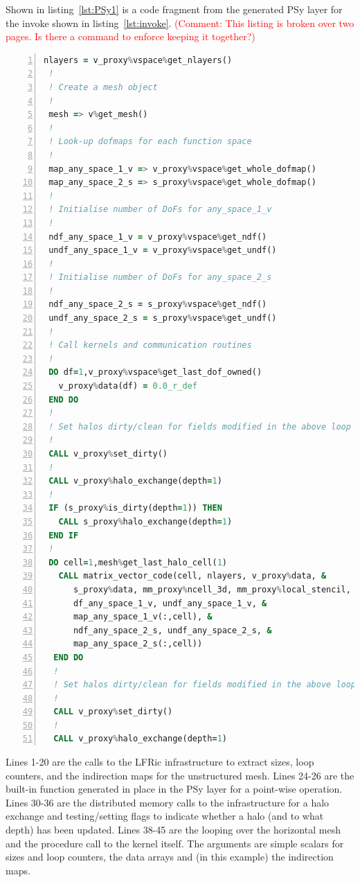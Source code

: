 \documentclass[times]{elsarticle}
\begin{document}
Shown in listing~\ref{lst:PSy1} is a code fragment from the generated PSy layer for
the invoke shown in listing~\ref{lst:invoke}.
\textcolor{red}{(Comment: This listing is broken over two pages. 
Is there a command to enforce keeping it together?)}
\begin{lstlisting}[language=Fortran, numbers=left,caption={Code 
fragment of the generated PSy layer},label={lst:PSy1}]
 nlayers = v_proxy%vspace%get_nlayers()
 !
 ! Create a mesh object
 !
 mesh => v%get_mesh()
 !
 ! Look-up dofmaps for each function space
 !
 map_any_space_1_v => v_proxy%vspace%get_whole_dofmap()
 map_any_space_2_s => s_proxy%vspace%get_whole_dofmap()
 !
 ! Initialise number of DoFs for any_space_1_v
 !
 ndf_any_space_1_v = v_proxy%vspace%get_ndf()
 undf_any_space_1_v = v_proxy%vspace%get_undf()
 !
 ! Initialise number of DoFs for any_space_2_s
 !
 ndf_any_space_2_s = s_proxy%vspace%get_ndf()
 undf_any_space_2_s = s_proxy%vspace%get_undf()
 !
 ! Call kernels and communication routines
 !
 DO df=1,v_proxy%vspace%get_last_dof_owned()
   v_proxy%data(df) = 0.0_r_def
 END DO 
 !
 ! Set halos dirty/clean for fields modified in the above loop
 !
 CALL v_proxy%set_dirty()
 !
 CALL v_proxy%halo_exchange(depth=1)
 !
 IF (s_proxy%is_dirty(depth=1)) THEN
   CALL s_proxy%halo_exchange(depth=1)
 END IF 
 !
 DO cell=1,mesh%get_last_halo_cell(1)
   CALL matrix_vector_code(cell, nlayers, v_proxy%data, &
      s_proxy%data, mm_proxy%ncell_3d, mm_proxy%local_stencil, &
      df_any_space_1_v, undf_any_space_1_v, &
      map_any_space_1_v(:,cell), &
      ndf_any_space_2_s, undf_any_space_2_s, &
      map_any_space_2_s(:,cell))
  END DO 
  !
  ! Set halos dirty/clean for fields modified in the above loop
  !
  CALL v_proxy%set_dirty()
  !
  CALL v_proxy%halo_exchange(depth=1)
\end{lstlisting}
Lines 1-20 are the calls to the LFRic infrastructure to extract
sizes, loop counters, and the indirection maps for the unstructured
mesh. Lines 24-26 are the built-in function generated in place in the
PSy layer for a point-wise operation. Lines 30-36 are the distributed
memory calls to the infrastructure for a halo exchange and
testing/setting flags to indicate whether a halo (and to what depth)
has been updated. Lines 38-45 are the looping over the horizontal mesh
and the procedure call to the kernel itself. The arguments are simple
scalars for sizes and loop counters, the data arrays and (in this example)
the indirection maps. 
\end{document}
